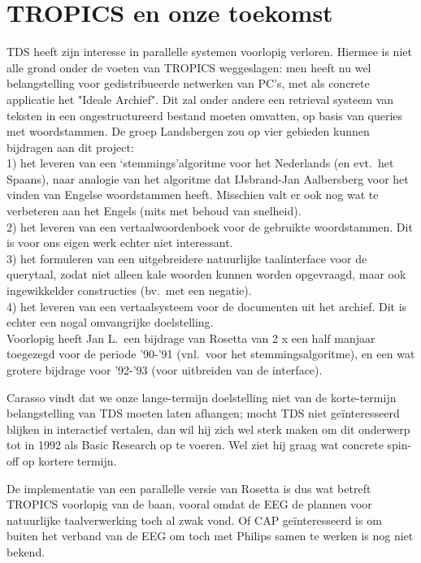 \section{TROPICS en onze toekomst}
TDS heeft zijn interesse in parallelle systemen voorlopig verloren. Hiermee is 
niet alle grond onder de voeten van TROPICS weggeslagen: men heeft nu wel 
belangstelling voor gedistribueerde netwerken van PC's, met als concrete 
applicatie het "Ideale Archief". Dit zal onder andere een retrieval systeem van 
teksten in een ongestructureerd bestand moeten omvatten, op basis van queries 
met woordstammen. De groep Landsbergen zou op vier gebieden kunnen bijdragen 
aan dit project:\\
1) het leveren van een `stemmings'algoritme voor het Nederlands  (en evt.\ het 
Spaans), naar analogie van het algoritme dat IJsbrand-Jan Aalbersberg voor 
het vinden van Engelse woordstammen heeft. Misschien valt er ook nog wat te 
verbeteren aan het Engels (mits met behoud van snelheid).\\
2) het leveren van een vertaalwoordenboek voor de gebruikte woordstammen. Dit 
is voor ons eigen werk echter niet interessant.\\
3) het formuleren van een uitgebreidere natuurlijke taalinterface voor de 
querytaal, zodat niet alleen kale woorden kunnen worden opgevraagd, maar ook 
ingewikkelder constructies (bv.\ met een negatie).\\
4) het leveren van een vertaalsysteem voor de documenten uit het archief.
Dit is echter een nogal omvangrijke doelstelling.\\
Voorlopig heeft Jan L.\ een bijdrage van Rosetta van 2 x een half manjaar 
toegezegd voor de periode '90-'91 (vnl.\ voor het stemmingsalgoritme), en een 
wat grotere bijdrage voor '92-'93 (voor uitbreiden van de interface).

Carasso vindt dat we onze lange-termijn doelstelling niet van de korte-termijn 
belangstelling van TDS moeten laten 
afhangen; mocht TDS niet ge\"{i}nteresseerd blijken in interactief vertalen, dan 
wil hij zich wel sterk maken om dit onderwerp tot in 1992 als Basic Research op 
te voeren. Wel ziet hij graag wat concrete spin-off op kortere termijn.

De implementatie van een parallelle versie van Rosetta is dus wat betreft 
TRO\-PICS voorlopig van de baan, vooral omdat de EEG de plannen voor natuurlijke 
taalverwerking toch al zwak vond. Of CAP ge\"{i}nteresseerd is om buiten het 
verband van de EEG om toch met Philips samen te werken is nog niet bekend.

